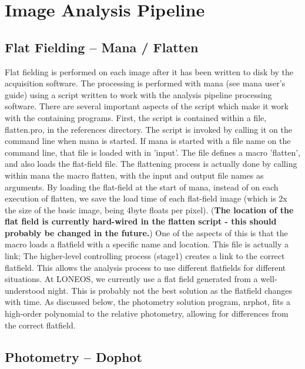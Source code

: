 \documentclass{article}
\newcommand{\note}[1]{({\bf #1})}
\begin{document}
\section{Image Analysis Pipeline}
\label{parallel}
\subsection{Flat Fielding -- Mana / Flatten}

Flat fielding is performed on each image after it has been written to
disk by the acquisition software.  The processing is performed with
mana (see mana user's guide) using a script written to work with the
analysis pipeline processing software.  There are several important
aspects of the script which make it work with the containing programs.
First, the script is contained within a file, flatten.pro, in the
references directory.  The script is invoked by calling it on the
command line when mana is started.  If mana is started with a file
name on the command line, that file is loaded with in 'input'.  The
file defines a macro 'flatten', and also loads the flat-field file.
The flattening process is actually done by calling within mana the
macro flatten, with the input and output file names as arguments.  By
loading the flat-field at the start of mana, instead of on each
execution of flatten, we save the load time of each flat-field image
(which is 2x the size of the basic image, being 4byte floats per
pixel).  \note{The location of the flat field is currently hard-wired in the
flatten script - this should probably be changed in the future.}  One
of the aspects of this is that the macro loads a flatfield with a
specific name and location.  This file is actually a link; The
higher-level controlling process (stage1) creates a link to the
correct flatfield.  This allows the analysis process to use different
flatfields for different situations.  At LONEOS, we currently use a
flat field generated from a well-understood night.  This is probably
not the best solution as the flatfield changes with time.  As
discussed below, the photometry solution program, nrphot, fits a
high-order polynomial to the relative photometry, allowing for
differences from the correct flatfield.
 
\subsection{Photometry -- Dophot}
\end{document}
